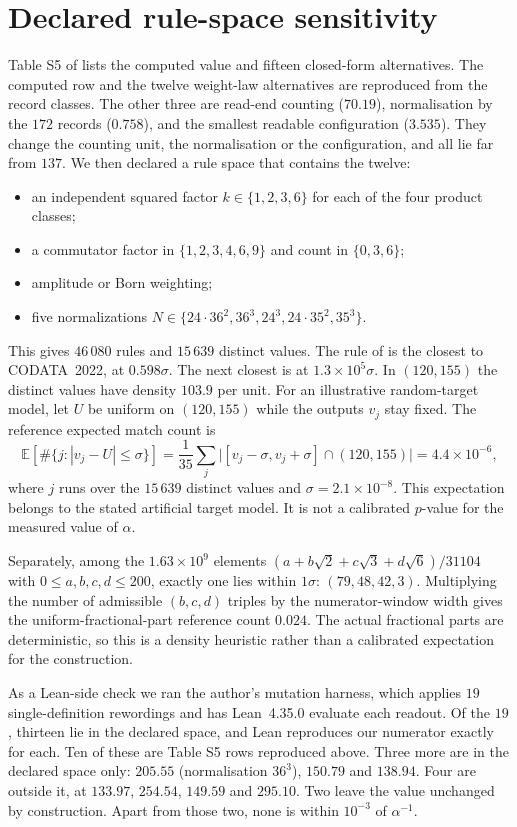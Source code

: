 \documentclass[11pt]{article}
\theoremstyle{remark}
\begin{document}
\section{Declared rule-space sensitivity}
Table S5 of \cite{wg} lists the computed value and fifteen closed-form alternatives. The computed row and the twelve weight-law alternatives are reproduced from the record classes. The other three are read-end counting ($70.19$), normalisation by the $172$ records ($0.758$), and the smallest readable configuration ($3.535$). They change the counting unit, the normalisation or the configuration, and all lie far from $137$. We then declared a rule space that contains the twelve:
\begin{itemize}
\item an independent squared factor $k\in\{1,2,3,6\}$ for each of the four product classes;
\item a commutator factor in $\{1,2,3,4,6,9\}$ and count in $\{0,3,6\}$;
\item amplitude or Born weighting;
\item five normalizations $N\in\{24\cdot36^2,36^3,24^3,24\cdot35^2,35^3\}$.
\end{itemize}
This gives $46\,080$ rules and $15\,639$ distinct values. The rule of \cite{wg} is the closest to CODATA~2022, at $0.598\sigma$. The next closest is at $1.3\times10^5\sigma$. In $(120,155)$ the distinct values have density $103.9$ per unit. For an illustrative random-target model, let $U$ be uniform on $(120,155)$ while the outputs $v_j$ stay fixed. The reference expected match count is
\[
 \mathbb E\!\left[\#\{j:|v_j-U|\le\sigma\}\right]
 =\frac1{35}\sum_j\bigl|[v_j-\sigma,v_j+\sigma]\cap(120,155)\bigr|
 =4.4\times10^{-6},
\]
where $j$ runs over the $15\,639$ distinct values and $\sigma=2.1\times10^{-8}$. This expectation belongs to the stated artificial target model. It is not a calibrated $p$-value for the measured value of $\alpha$.

Separately, among the $1.63\times10^9$ elements $(a+b\sqrt2+c\sqrt3+d\sqrt6)/31104$ with $0\le a,b,c,d\le200$, exactly one lies within $1\sigma$: $(79,48,42,3)$. Multiplying the number of admissible $(b,c,d)$ triples by the numerator-window width gives the uniform-fractional-part reference count $0.024$. The actual fractional parts are deterministic, so this is a density heuristic rather than a calibrated expectation for the construction.

As a Lean-side check we ran the author's mutation harness, which applies $19$ single-definition rewordings and has Lean~4.35.0 evaluate each readout. Of the $19$, thirteen lie in the declared space, and Lean reproduces our numerator exactly for each. Ten of these are Table S5 rows reproduced above. Three more are in the declared space only: $205.55$ (normalisation $36^3$), $150.79$ and $138.94$. Four are outside it, at $133.97$, $254.54$, $149.59$ and $295.10$. Two leave the value unchanged by construction. Apart from those two, none is within $10^{-3}$ of $\alpha^{-1}$.
\end{document}
